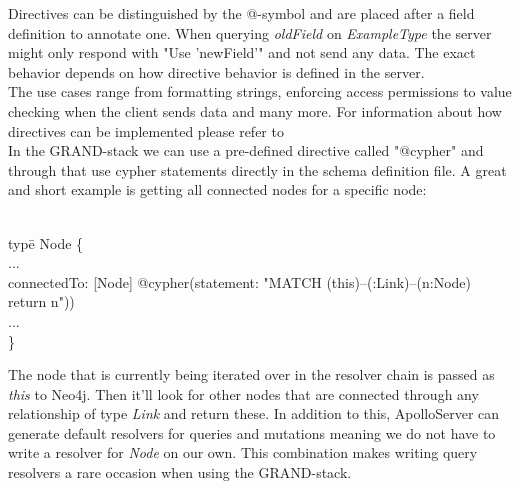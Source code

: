 Directives can be distinguished by the @-symbol and are placed after a field definition to annotate one. When querying \emph{oldField} on \emph{ExampleType} the server might only respond with "Use 'newField'" and not send any data. The exact behavior depends on how directive behavior is defined in the server. \\
The use cases range from formatting strings, enforcing access permissions to value checking when the client sends data and many more. For information about how directives can be implemented please refer to
\\
In the GRAND-stack we can use a pre-defined directive called "@cypher" and through that use cypher statements directly in the schema definition file. A great and short example is getting all connected nodes for a specific node:
\begin{exmp}
\label{ex246}
\begin{tabbing}
\\
typ\=e Node \{ \\
\> ... \\
\> connectedTo: [Node] @cypher(statement: "MATCH (this)--(:Link)--(n:Node) return n")) \\
\> ...\\
\}
\end{tabbing}
\end{exmp}
The node that is currently being iterated over in the resolver chain is passed as \emph{this} to Neo4j. Then it'll look for other nodes that are connected through any relationship of type \emph{Link} and return these. In addition to this, ApolloServer can generate default resolvers for queries and mutations meaning we do not have to write a resolver for \emph{Node} on our own. This combination makes writing query resolvers a rare occasion when using the GRAND-stack.


